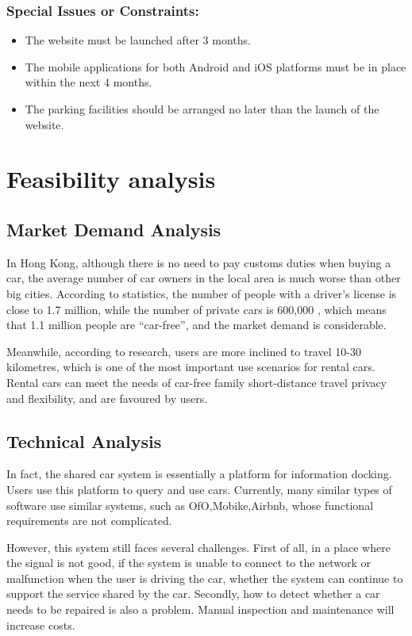 \documentclass{article}
\begin{document}
        \subsubsection{Special Issues or Constraints:}
        \begin{itemize}
            \item The website must be launched after 3 months.
            \item The mobile applications for both Android and iOS platforms must be in place within the next 4 months.
            \item The parking facilities should be arranged no later than the launch of the website. 
        \end{itemize}
        
        \newpage
\section{Feasibility analysis}
    \subsection{Market Demand Analysis}
    
    In Hong Kong, although there is no need to pay customs duties when buying a car, the average number of car owners in the local area is much worse than other big cities.
    According to statistics, the number of people with a driver's license is close to 1.7 million, while the number of private cars is 600,000 , which means that 1.1 million people are “car-free”, and the market demand is considerable.
    
    Meanwhile, according to research, users are more inclined to travel 10-30 kilometres, which is one of the most important use scenarios for rental cars.
    Rental cars can meet the needs of car-free family short-distance travel privacy and flexibility, and are favoured by users.
    
    \subsection{Technical Analysis}
    
    In fact, the shared car system is essentially a platform for information docking.
    Users use this platform to query and use cars.
    Currently, many similar types of software use similar systems, such as OfO,Mobike,Airbnb, whose functional requirements are not complicated.
    
    However, this system still faces several challenges.
    First of all, in a place where the signal is not good, if the system is unable to connect to the network or malfunction when the user is driving the car, whether the system can continue to support the service shared by the car.
    Secondly, how to detect whether a car needs to be repaired is also a problem.
    Manual inspection and maintenance will increase costs.
\end{document}
